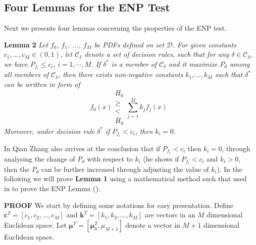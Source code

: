 \subsection{Four Lemmas for the ENP Test}
Next we presents four lemmas concerning the properties of the ENP test.

\newcommand{\bmu}{\boldsymbol{\mu}}
\typeout{}


\noindent \textbf{Lemma 2}
\noindent \textit{
Let $f_0$, $f_1$, ..., $f_M$ be PDFs defined on set $\mathcal{D}$. For given constants $c_1, ..., c_M \in (0, 1)$, let $\mathcal{C}_\delta$ denote a set of decision rules,  such that for any $\delta \in \mathcal{C}_\delta$, we have $P_{f_i} \leq c_i$, $i = 1, \cdots, M$.
If  $\delta^{\ast}$ is a member of $\mathcal{C}_\delta$ and it maximize $P_d$ among all members of $\mathcal{C}_\delta$, then there exists non-negative constants $k_1, ..., k_M$ such that $\delta^\ast$ can be written in form of  
\begin{equation}
f_0(x) \substack{H_0 \\ \geq \\ < \\ \bar{H}_0} \sum_{j=1}^{M}k_jf_j(x)
\end{equation}
Moreover, under decision rule $\delta^\ast$ if  $P_{f_i} < c_i$, then $k_i = 0$. 
}

In \cite{zhang1999design, zhang2000efficient} Qian Zhang also arrives at the conclusion that if $P_{f_i} < c_i$ then $k_i = 0$, through analysing the change of $P_d$ with respect to $k_i$ (he shows if $P_{f_i} < c_i$ and $k_i > 0$, then the $P_d$ can be further increased through adjusting the value of $k_i$). In the following we will prove \textbf{Lemma 1} using a mathematical method such that used in \cite{LehmannTest, dantzig1951fundamental} to prove the ENP Lemma ().

\noindent\textbf{PROOF}
We start by defining some notations for easy presentation.
Define $\mathbf{c}^T = [c_1, c_2, ..., c_M]$ and  $\mathbf{k}^T = [k_1, k_2, ..., k_M]$  are vectors in an $M$ dimensional Euclidean  space. Let $\bmu^T = [\bmu_0^T, \mu_{M+1}]$ denote a vector in $M+1$ dimensional Euclidean space. 

